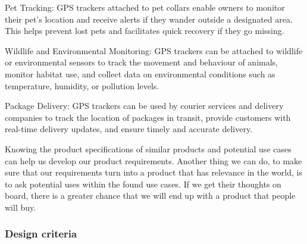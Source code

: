 Pet Tracking: \ac{GPS} trackers attached to pet collars enable owners to monitor their pet's location and receive alerts if they wander outside a designated area. This helps prevent lost pets and facilitates quick recovery if they go missing.

Wildlife and Environmental Monitoring: \ac{GPS} trackers can be attached to wildlife or environmental sensors to track the movement and behaviour of animals, monitor habitat use, and collect data on environmental conditions such as temperature, humidity, or pollution levels.

Package Delivery: \ac{GPS} trackers can be used by courier services and delivery companies to track the location of packages in transit, provide customers with real-time delivery updates, and ensure timely and accurate delivery.

Knowing the product specifications of similar products and potential use cases can help us develop our product requirements.
Another thing we can do, to make sure that our requirements turn into a product that has relevance in the world, is to ask potential uses within the found use cases. If we get their thoughts on board, there is a greater chance that we will end up with a product that people will buy.

\subsubsection{Design criteria}


